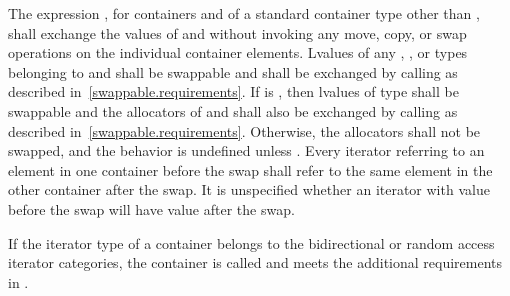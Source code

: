\pnum
The expression , for containers  and  of a standard
container type other than , shall exchange the values of  and
 without invoking any move, copy, or swap operations on the individual
container elements.
Lvalues of any , , or  types
belonging to  and  shall be swappable
and shall be exchanged by calling 
as described in~\ref{swappable.requirements}. If
 is
, then
lvalues of type  shall be swappable and
the allocators of  and  shall also be exchanged
by calling  as described in~\ref{swappable.requirements}.
Otherwise, the allocators shall not be swapped, and the behavior is
undefined unless . Every iterator
referring to an element in one container before the swap shall refer to the same
element in the other container after the swap. It is unspecified whether an iterator
with value  before the swap will have value  after the
swap.

\pnum
If the iterator type of a container belongs to the bidirectional or
random access iterator categories,
the container is called
and meets the additional requirements
in .


